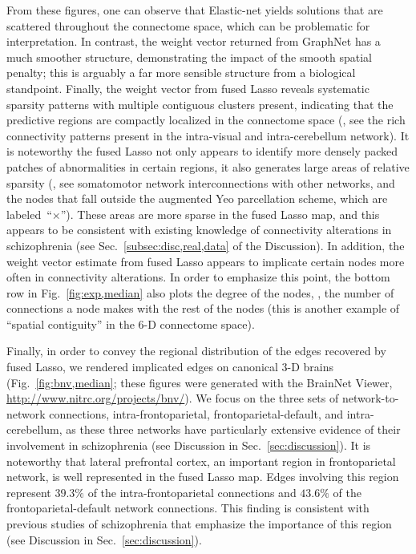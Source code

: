 From these figures, one can observe that Elastic-net yields solutions that are scattered throughout the connectome space, which can be problematic for interpretation.
In contrast, the weight vector returned from GraphNet has a much smoother structure, demonstrating the impact of the smooth spatial penalty; this is arguably a far more sensible structure from a biological standpoint.
Finally, the weight vector from fused Lasso reveals systematic sparsity patterns with multiple contiguous clusters present, indicating that the predictive regions are compactly localized in the connectome space (\eg, see the rich connectivity patterns present in the intra-visual and intra-cerebellum network).
It is noteworthy the fused Lasso not only appears to identify more densely packed patches of abnormalities in certain regions, it also generates large areas of relative sparsity (\eg, see somatomotor network interconnections with other networks, and the nodes that fall outside the augmented Yeo parcellation scheme, which are labeled~``$\times$''). 
These areas are more sparse in the fused Lasso map, and this appears to be consistent with existing knowledge of connectivity alterations in schizophrenia (see Sec.~\ref{subsec:disc,real,data} of the Discussion). 
In addition, the weight vector estimate from fused Lasso appears to implicate certain nodes more often in connectivity alterations. 
In order to emphasize this point, the bottom row in Fig.~\ref{fig:exp,median} also plots the degree of the nodes, \ie, the number of connections a node makes with the rest of the nodes (this is another example of ``spatial contiguity'' in the $6$-D connectome space).

Finally, in order to convey the regional distribution of the edges recovered by fused Lasso, we rendered implicated edges on canonical $3$-D brains (Fig.~\ref{fig:bnv,median}; these figures were generated with the BrainNet Viewer, \url{http://www.nitrc.org/projects/bnv/}).
We focus on the three sets of network-to-network connections, intra-frontoparietal, frontoparietal-default, and intra-cerebellum, as these three networks have particularly extensive evidence of their involvement in schizophrenia (see Discussion in Sec.~\ref{sec:discussion}).
It is noteworthy that lateral prefrontal cortex, an important region in frontoparietal network, is well represented in the fused Lasso map. 
Edges involving this region represent $39.3\%$ of the intra-frontoparietal connections and $43.6\%$ of the frontoparietal-default network connections. 
This finding is consistent with previous studies of schizophrenia that emphasize the importance of this region (see Discussion in Sec.~\ref{sec:discussion}). 

